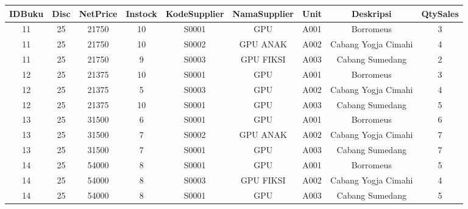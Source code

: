 \documentclass[12pt,a4paper]{article}
\begin{document}
\begin{enumerate}
\begin{enumerate}
            \begin{center}
              \begin{adjustbox}{scale=0.5,center}
                \begin{tabular}{ |c|c|c|c|c|c|c|c|c| } \hline
                  IDBuku &  Disc & NetPrice & Instock & KodeSupplier & NamaSupplier & Unit & Deskripsi           & QtySales \\ \hline
                  11     &  25   & 21750    & 10      & S0001        & GPU          & A001 & Borromeus           & 3        \\ \hline
                  11     &  25   & 21750    & 10      & S0002        & GPU ANAK     & A002 & Cabang Yogja Cimahi & 4        \\ \hline
                  11     &  25   & 21750    & 9       & S0003        & GPU FIKSI    & A003 & Cabang Sumedang     & 2        \\ \hline
                  12     &  25   & 21375    & 10      & S0001        & GPU          & A001 & Borromeus           & 3        \\ \hline
                  12     &  25   & 21375    & 5       & S0003        & GPU          & A002 & Cabang Yogja Cimahi & 4        \\ \hline
                  12     &  25   & 21375    & 10      & S0001        & GPU          & A003 & Cabang Sumedang     & 5        \\ \hline
                  13     &  25   & 31500    & 6       & S0001        & GPU          & A001 & Borromeus           & 6        \\ \hline
                  13     &  25   & 31500    & 7       & S0002        & GPU ANAK     & A002 & Cabang Yogja Cimahi & 7        \\ \hline
                  13     &  25   & 31500    & 7       & S0001        & GPU          & A003 & Cabang Sumedang     & 7        \\ \hline
                  14     &  25   & 54000    & 8       & S0001        & GPU          & A001 & Borromeus           & 5        \\ \hline
                  14     &  25   & 54000    & 8       & S0003        & GPU FIKSI    & A002 & Cabang Yogja Cimahi & 4        \\ \hline
                  14     &  25   & 54000    & 8       & S0001        & GPU          & A003 & Cabang Sumedang     & 5        \\ \hline
                \end{tabular}
              \end{adjustbox}
            \end{center}


\end{enumerate}
\end{enumerate}
\end{document}
